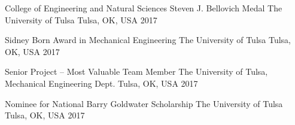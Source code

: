 \begin{cvhonors}

  \cvhonor
    {College of Engineering and Natural Sciences Steven J. Bellovich Medal} %
    {The University of Tulsa} %
    {Tulsa, OK, USA} %
    {2017} %

  \cvhonor
    {Sidney Born Award in Mechanical Engineering} %
    {The University of Tulsa} %
    {Tulsa, OK, USA} %
    {2017} %

  \cvhonor
    {Senior Project -- Most Valuable Team Member} %
    {The University of Tulsa, Mechanical Engineering Dept.} %
    {Tulsa, OK, USA} %
    {2017} %


  \cvhonor
    {Nominee for National Barry Goldwater Scholarship} %
    {The University of Tulsa} %
    {Tulsa, OK, USA} %
    {2017} %
    

\end{cvhonors}
